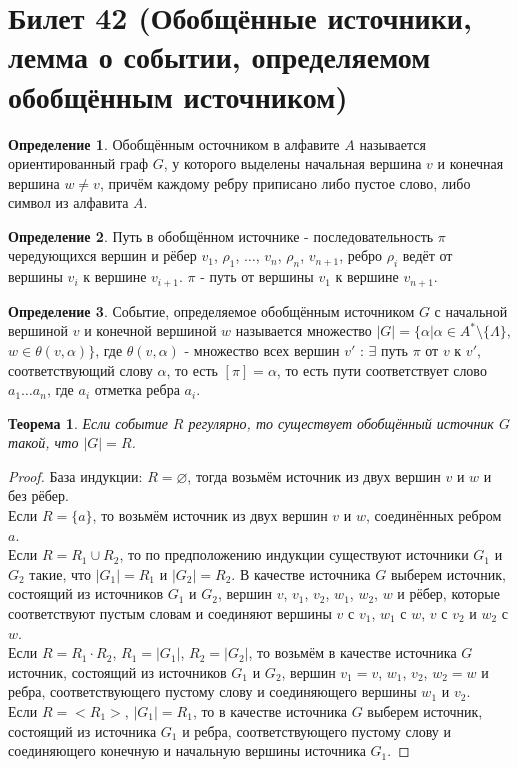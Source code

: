 \documentclass[a4paper, 12pt]{article}
\theoremstyle{definition}
\newtheorem*{definition}{Определение}
\theoremstyle{plain}
\newtheorem*{theorem}{Теорема}
\theoremstyle{remark}
\begin{document}
  \section{Билет 42 (Обобщённые источники, лемма о событии, определяемом обобщённым источником)}
  \begin{definition}
    Обобщённым осточником в алфавите $A$ называется ориентированный граф $G$, у которого выделены начальная вершина $v$ и конечная вершина $w\neq v$, причём каждому ребру приписано либо пустое слово, либо символ из алфавита $A$.
  \end{definition}
  \begin{definition}
    Путь в обобщённом источнике - последовательность $\pi$ чередующихся вершин и рёбер $v_1$, $\rho_1$, $\ldots$, $v_n$, $\rho_n$, $v_{n+1}$, ребро $\rho_i$ ведёт от вершины $v_i$ к вершине $v_{i+1}$. $\pi$ - путь от вершины $v_1$ к вершине $v_{n+1}$.
  \end{definition}
  \begin{definition}
    Событие, определяемое обобщённым источником $G$ с начальной вершиной $v$ и конечной вершиной $w$ называется множество $|G|=\{\alpha|\alpha\in A^*\setminus\{\Lambda\}$, $w\in \theta(v,\alpha)\}$, где $\theta(v,\alpha)$ - множество всех вершин $v'$ : $\exists$ путь $\pi$ от $v$ к $v'$, соответствующий слову $\alpha$, то есть $[\pi]=\alpha$, то есть пути соответствует слово $a_1\ldots a_n$, где $a_i$ отметка ребра $a_i$.
  \end{definition}
  \begin{theorem}
    Если событие $R$ регулярно, то существует обобщённый источник $G$ такой, что $|G|=R$.
  \end{theorem}
  \begin{proof}
    База индукции: $R=\varnothing$, тогда возьмём источник из двух вершин $v$ и $w$ и без рёбер.\\
    Если $R=\{a\}$, то возьмём источник из двух вершин $v$ и $w$, соединённых ребром $a$.\\
    Если $R=R_1\cup R_2$, то по предположению индукции существуют источники $G_1$ и $G_2$ такие, что $|G_1|=R_1$ и $|G_2|=R_2$. В качестве источника $G$ выберем источник, состоящий из источников $G_1$ и $G_2$, вершин $v$, $v_1$, $v_2$, $w_1$, $w_2$, $w$ и рёбер, которые соответствуют пустым словам и соединяют вершины $v$ с $v_1$, $w_1$ с $w$, $v$ с $v_2$ и $w_2$ с $w$.\\
    Если $R=R_1\cdot R_2$, $R_1=|G_1|$, $R_2=|G_2|$, то возьмём в качестве источника $G$ источник, состоящий из источников $G_1$ и $G_2$, вершин $v_1=v$, $w_1$, $v_2$, $w_2=w$ и ребра, соответствующего пустому слову и соединяющего вершины $w_1$ и $v_2$.\\
    Если $R=<R_1>$, $|G_1|=R_1$, то в качестве источника $G$ выберем источник, состоящий из источника $G_1$ и  ребра, соответствующего пустому слову и соединяющего конечную и начальную вершины источника $G_1$.
  \end{proof}
\end{document}
